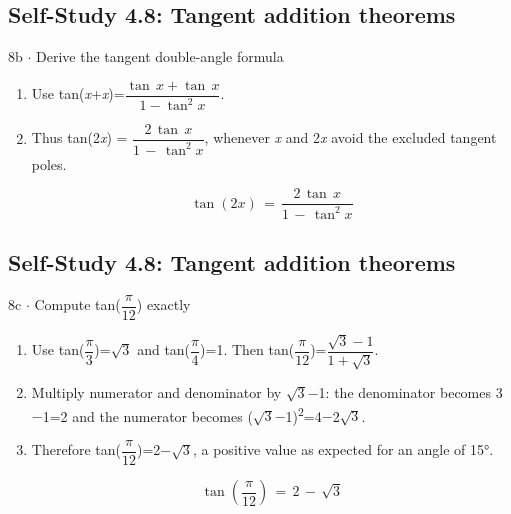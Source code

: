 \documentclass[11pt]{article}
\begin{document}
\begin{keepsection}\subsection{Self-Study 4.8: Tangent addition theorems}

\begin{workedbox}{8b \ensuremath{\cdot} Derive the tangent double-angle formula}
\begin{enumerate}
\item Use tan(\textit{x}+\textit{x})={\small\ensuremath{\dfrac{\tan \, {x}+\tan \, {x}}{1-\tan ^{2}{x}}}}.
\item {}
Thus tan(2\textit{x}) = {\small\ensuremath{\dfrac{2\, \tan \, {x}}{1\, -\, \tan ^{2}{x}}}}, whenever \textit{x} and 2\textit{x} avoid the excluded tangent poles.

\begin{equation*}\tan (2{x})\, =\, \dfrac{2\, \tan \, {x}}{1\, -\, \tan ^{2}{x}}\end{equation*}
\end{enumerate}
\end{workedbox}

\end{keepsection}
\begin{keepsection}\subsection{Self-Study 4.8: Tangent addition theorems}

\begin{workedbox}{8c \ensuremath{\cdot} Compute tan({\small\ensuremath{\dfrac{π}{12}}}) exactly}
\begin{enumerate}
\item Use tan({\small\ensuremath{\dfrac{π}{3}}})=\ensuremath{\sqrt{3}} and tan({\small\ensuremath{\dfrac{π}{4}}})=1. Then tan({\small\ensuremath{\dfrac{π}{12}}})={\small\ensuremath{\dfrac{\sqrt{3}-1}{1+\sqrt{3}}}}.
\item Multiply numerator and denominator by \ensuremath{\sqrt{3}}\ensuremath{-}1: the denominator becomes 3\ensuremath{-}1=2 and the numerator becomes (\ensuremath{\sqrt{3}}\ensuremath{-}1)\textsuperscript{2}=4\ensuremath{-}2\ensuremath{\sqrt{3}}.
\item {}
Therefore tan({\small\ensuremath{\dfrac{π}{12}}})=2\ensuremath{-}\ensuremath{\sqrt{3}}, a positive value as expected for an angle of 15°.

\begin{equation*}\tan \left(\dfrac{π}{12}\right)\, =\, 2\, -\, \sqrt{3}\end{equation*}
\end{enumerate}
\end{workedbox}

\end{keepsection}
\end{document}
